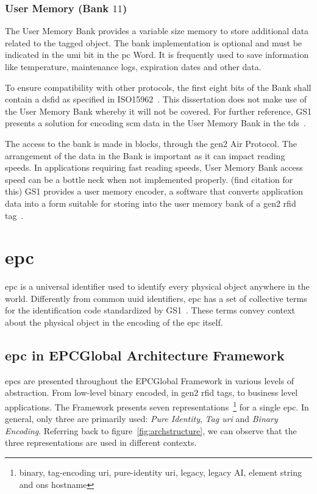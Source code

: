 \subsubsection{User Memory (Bank $11$)}

The User Memory Bank provides a variable size memory to store additional data related to the tagged object.
The bank implementation is optional and must be indicated in the \ac{umi} bit in the \ac{pc} Word.
It is frequently used to save information like temperature, maintenance logs, expiration dates and other data.

To ensure compatibility with other protocols, the first eight bits of the Bank shall contain a \ac{dsfid} as specified in ISO15962~\cite{isoISOIEC15962}.
This dissertation does not make use of the User Memory Bank whereby it will not be covered.
For further reference, GS1 presents a solution for encoding \ac{scm} data in the User Memory Bank in the \ac{tds}~\cite{GS1EPCTDS}.

The access to the bank is made in blocks, through the \ac{gen2} Air Protocol. The arrangement of the data in the Bank is important as it can impact reading speeds.
In applications requiring fast reading speeds, User Memory Bank access speed can be a bottle neck when not implemented properly. (find citation for this)
GS1 provides a user memory encoder, a software that converts application data into a form suitable for storing into the user memory bank of a \ac{gen2} \ac{rfid} tag~\cite{marco.santos.diamondFAQ2020}.

\section{\ac{epc}} \label{sec:epc}


\ac{epc} is a universal identifier used to identify every physical object anywhere in the world.
Differently from common \ac{uuid} identifiers, \ac{epc} has a set of collective terms for the identification code standardized by GS1~\cite{GS1GeneralSpecifications}. These terms convey context about the physical object in the encoding of the \ac{epc} itself.

\subsection{\ac{epc} in EPCGlobal Architecture Framework}

\acp{epc} are presented throughout the EPCGlobal Framework in various levels of abstraction. From low-level binary encoded, in \ac{gen2} \ac{rfid} tags, to business level applications.
The Framework presents seven representations~\footnote{binary, tag-encoding \ac{uri}, pure-identity \ac{uri}, legacy, legacy AI, element string and \ac{ons} hostname} for a single \ac{epc}. In general, only three are primarily used: \emph{Pure Identity}, \emph{Tag \ac{uri}} and \emph{Binary Encoding}.
Referring back to figure~\ref{fig:archstructure}, we can observe that the three representations are used in different contexts.

